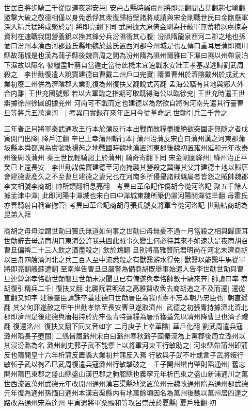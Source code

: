 世民自將步騎三千從間道夜趨安邑|{
	安邑古縣時屬虞州將即亮翻間古莧翻趨七喻翻}
邀擊大破之敬德相僅以身免悉俘其衆復歸栢壁諸將咸請與宋金剛戰世民曰金剛懸軍深入精兵猛將咸聚於是|{
	將即亮翻下同}
武周據大原倚金剛為扞蔽軍無蓄積以虜掠為資利在速戰我閉營養銳以挫其鋒分兵汾隰衝其心腹|{
	汾隰隋龍泉西河二郡之地也孫愐曰汾州本漢西河郡兹氏縣地魏於兹氏置西河郡今州城是也左傳曰重耳居蒲即隰川縣故蒲城是也漢為蒲子縣後魏齊周之間為汾州隋為隰州爾雅曰下濕曰隰以州帶泉泊下濕故以隰名}
彼糧盡計窮自當遁走當待此機未宜速戰永安壯王孝基謀逃歸劉武周殺之　李世勣復遣人說竇建德曰曹戴二州戶口完實|{
	隋置曹州於濟陰戴州於成武大業初廢二州併為濟陰郡大業亂復為州復扶又翻說式芮翻}
孟海公竊有其地與鄭人外合内離|{
	王世充國號鄭}
若以大軍臨之指期可取既得海公以臨徐兖|{
	王世充時遣王世辯據徐州徐圓朗據兖州}
河南可不戰而定也建德以為然欲自將徇河南先遣其行臺曹旦等將兵五萬濟河　|{
	考異曰實録在來年正月今從革命記}
世勣引兵三千會之

三年春正月將軍秦武通攻王行本於蒲反行本出戰而敗糧盡援絶欲突圍走無隨之者戊寅開門出降|{
	降戶江翻}
辛巳上幸蒲州斬行本|{
	蒲州治蒲反宋白曰蒲州漢之河東郡蒲坂縣本舜都周為虞虢耿揚芮之地戰國時魏地漢置河東郡後魏初置雍州延和元年改泰州後周改蒲州}
秦王世民輕騎謁上於蒲州|{
	騎奇寄翻下同}
宋金剛圍絳州|{
	絳州治正平}
癸巳上還長安　李世勣謀俟竇建德至河南掩襲其營殺之冀得其父并建德土地以歸唐會建德妻產久之不至曹旦建德之妻兄也在河南多所侵擾諸賊羈屬者皆怨之賊帥魏郡李文相號李商胡|{
	帥所類翻相息亮翻　考異曰革命記作傷胡今從河洛記}
聚五千餘人據孟津中潬|{
	此即河陽中潬城也宋白曰中潬城東魏所築仍置河陽關潬徒旱翻}
母霍氏亦善騎射自稱霍揔管|{
	考異曰革命記商胡母張氏號女將軍今從河洛記}
世勣結商胡為昆弟入拜

商胡之母母泣謂世勣曰竇氏無道如何事之世勣曰母無憂不過一月當殺之相與歸唐耳世勣辭去母謂商胡曰東海公許我共圖此賊事久變生何必待其來不如速决是夜商胡召曹旦偏禆二十三人飲之酒盡殺之|{
	飲於鴆翻}
旦别將高雅賢阮君明尚在河北未濟商胡以巨舟四艘濟河北之兵三百人至中流悉殺之有獸醫游水得免|{
	獸醫以能醫牛馬從軍將即亮翻艘蘇遭翻}
至南岸告曹旦旦嚴警為備商胡既舉事始遣人告李世勣世勣與曹旦連營郭孝恪勸世勣襲旦世勣未决聞旦已有備遂與孝恪帥數十騎來奔|{
	帥讀曰率}
商胡復引精兵二千|{
	復扶又翻}
北襲阮君明破之高雅賢收衆去商胡追之不及而還|{
	還從宣翻又如字}
建德羣臣請誅李蓋建德曰世勣唐臣為我所虜不忘本朝乃忠臣也|{
	朝直遥翻}
其父何罪遂赦之甲午世勣孝恪至長安曹旦遂取濟州|{
	武德之初張青持據濟北濟北郡即濟州是後建德與唐相持於虎牢張青特運糧為唐所獲蓋先以濟州降曹旦也濟子禮翻}
復還洺州|{
	復扶又翻下同又音如字}
二月庚子上幸華陰|{
	華戶化翻}
劉武周遣兵寇潞州䧟長子壺關|{
	二縣皆屬潞州宋白曰潞州春秋潞子國秦漢為上黨郡後周立潞州以其浸汾潞為名}
潞州刺史郭子武不能禦上以將軍河東王行敏助之|{
	河東縣帶蒲州即蒲反也隋開皇十六年析蒲反置縣大業初并蒲反入焉}
行敏與子武不叶或言子武將叛行敏斬子武以徇乙巳武周復遣兵寇潞州行敏擊破之　壬子開州蠻冉肇則䧟通州|{
	舊志開州隋巴東郡之盛山縣盛山漢巴郡之朐䏰縣也義寧元年析巴東之盛山新浦通川之萬世西流置萬州武德元年改開州通州漢宕渠縣地梁置萬州元魏改通州隋為通州郡武德元年復為通州孫愐曰通州本漢宕渠縣内有地萬餘頃因名為萬州後魏以萬州居四達之路改為通州宋為達州}
甲寅遣將軍桑顯和等攻呂崇茂於夏縣|{
	夏戶雅翻}
初

